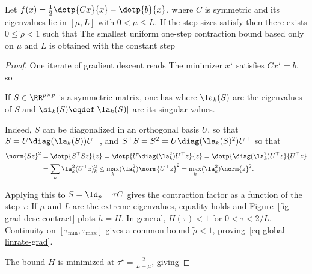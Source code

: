 \begin{prop}\label{prop-graddesc-quad}
	Let $f(x)=\frac12\dotp{Cx}{x}-\dotp{b}{x}$, where $C$ is symmetric and its eigenvalues lie in $[\mu,L]$ with $0<\mu\leq L$. If the step sizes satisfy
	then there exists $0 \leq \tilde\rho<1$ such that 
	The smallest uniform one-step contraction bound based only on $\mu$ and $L$ is obtained with the constant step
\end{prop}
\begin{proof}
	One iterate of gradient descent reads 
	The minimizer $x^\star$ satisfies $Cx^\star=b$, so
	  
	If $S \in \RR^{p \times p}$ is a symmetric matrix, one has 
	where $\la_k(S)$ are the eigenvalues of $S$ and $\si_k(S) \eqdef |\la_k(S)|$ are its singular values.
	 
	Indeed, $S$ can be diagonalized in an orthogonal basis $U$, so that $S=U \diag(\la_k(S)) U^\top$,
	and $S^\top S = S^2 = U \diag(\la_k(S)^2) U^\top$ so that 
	\begin{align*}
		\norm{Sz}^2 &= \dotp{S^\top S z}{z} = \dotp{U\diag(\la_k^2)U^\top z}{z}
		=\dotp{\diag(\la_k^2) U^\top z}{U^\top z} \\
		&= \sum_k\la_k^2 (U^\top z)_k^2 \leq \max_k(\la_k^2) \norm{U^\top z}^2
		= \max_k(\la_k^2) \norm{z}^2.
	\end{align*}
	
	Applying this to $S = \Id_p-\tau C$ gives the contraction factor as a function of the step $\tau$:
	If $\mu$ and $L$ are the extreme eigenvalues, equality holds and Figure~\ref{fig-grad-desc-contract} plots $h=H$. In general, $H(\tau)<1$ for $0<\tau<2/L$. Continuity on $[\tau_{\min},\tau_{\max}]$ gives a common bound $\tilde\rho<1$, proving~\eqref{eq-global-linrate-grad}.
	 
	The bound $H$ is minimized at $\tau^\star = \frac{2}{L+\mu}$, giving
\end{proof}



